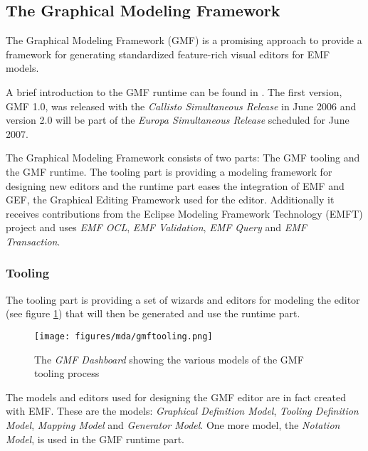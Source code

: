 \subsection{The Graphical Modeling Framework}
\label{sec:mda_gmf}

The Graphical Modeling Framework (GMF) \cite{GMF} is a promising approach to provide a framework for generating standardized feature-rich visual editors for EMF models.

A brief introduction to the GMF runtime can be found in \cite{gmf_intro,gmf_arch}. The first version, GMF 1.0, was released with the \emph{Callisto Simultaneous Release} in June 2006 and version 2.0 will be part of the \emph{Europa Simultaneous Release} scheduled for June 2007.

The Graphical Modeling Framework consists of two parts: The GMF tooling and the GMF runtime. The tooling part is providing a modeling framework for designing new editors and the runtime part eases the integration of EMF and GEF, the Graphical Editing Framework \cite{GEF} used for the editor. Additionally it receives contributions from the Eclipse Modeling Framework Technology (EMFT) project and uses \emph{EMF OCL}, \emph{EMF Validation}, \emph{EMF Query} and \emph{EMF Transaction}.

\subsubsection*{Tooling}
The tooling part is providing a set of wizards and editors for modeling the editor (see figure \ref{fig:gmftooling}) that will then be generated and use the runtime part.

\begin{figure}[htp]
	\centering
	\texttt{[image: figures/mda/gmftooling.png]}
	\caption[The GMF Dashboard]{The \emph{GMF Dashboard} showing the various models of the GMF tooling process}
	\label{fig:gmftooling}
\end{figure}

The models and editors used for designing the GMF editor are in fact created with EMF. These are the models: \emph{Graphical Definition Model}, \emph{Tooling Definition Model}, \emph{Mapping Model} and \emph{Generator Model}. One more model, the \emph{Notation Model}, is used in the GMF runtime part.

